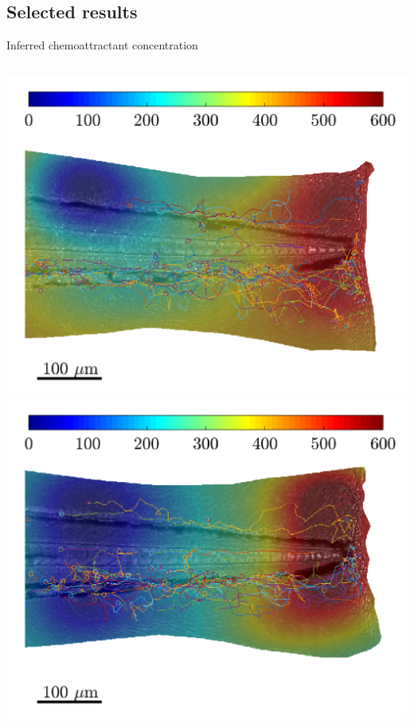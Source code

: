\documentclass[mathserif,11pt]{beamer}
\begin{document}
\subsection{Selected results}
\begin{frame}{Inferred chemoattractant concentration}
\begin{columns}
	\begin{column}{0.3\textwidth}
		\includegraphics[scale=0.19]{Figures/field_tracks_1.png}
		\vspace{0.4cm}
		\includegraphics[scale=0.19]{Figures/field_tracks_3.png}
	\end{column}

\end{columns}
\end{frame}
\end{document}
